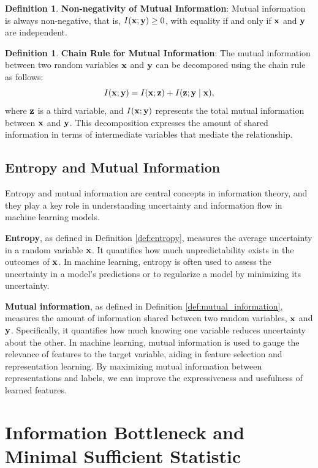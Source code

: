 \documentclass[11pt, oneside]{book}
\theoremstyle{plain}
\theoremstyle{definition}
\newtheorem{definition}[theorem]{Definition}
\theoremstyle{remark}
\begin{document}
\begin{definition}
\textbf{Non-negativity of Mutual Information}: Mutual information is always non-negative, that is, $I({\mathbf{x}}; {\mathbf{y}}) \geq 0$, with equality if and only if ${\mathbf{x}}$ and ${\mathbf{y}}$ are independent.
\label{def:nonneg_mi}
\end{definition}

\begin{definition}
\textbf{Chain Rule for Mutual Information}: The mutual information between two random variables ${\mathbf{x}}$ and ${\mathbf{y}}$ can be decomposed using the chain rule as follows:
\[
I({\mathbf{x}}; {\mathbf{y}}) = I({\mathbf{x}}; {\mathbf{z}}) + I({\mathbf{z}}; {\mathbf{y}} \mid {\mathbf{x}}),
\]
where ${\mathbf{z}}$ is a third variable, and $I({\mathbf{x}}; {\mathbf{y}})$ represents the total mutual information between ${\mathbf{x}}$ and ${\mathbf{y}}$. This decomposition expresses the amount of shared information in terms of intermediate variables that mediate the relationship.
\label{def:chain_rule_mi}
\end{definition}

\subsection{Entropy and Mutual Information}

Entropy and mutual information are central concepts in information theory, and they play a key role in understanding uncertainty and information flow in machine learning models. 

\textbf{Entropy}, as defined in Definition \ref{def:entropy}, measures the average uncertainty in a random variable ${\mathbf{x}}$. It quantifies how much unpredictability exists in the outcomes of ${\mathbf{x}}$. In machine learning, entropy is often used to assess the uncertainty in a model's predictions or to regularize a model by minimizing its uncertainty.

\textbf{Mutual information}, as defined in Definition \ref{def:mutual_information}, measures the amount of information shared between two random variables, ${\mathbf{x}}$ and ${\mathbf{y}}$. Specifically, it quantifies how much knowing one variable reduces uncertainty about the other. In machine learning, mutual information is used to gauge the relevance of features to the target variable, aiding in feature selection and representation learning. By maximizing mutual information between representations and labels, we can improve the expressiveness and usefulness of learned features.

\section{Information Bottleneck and Minimal Sufficient Statistic}
\end{document}
